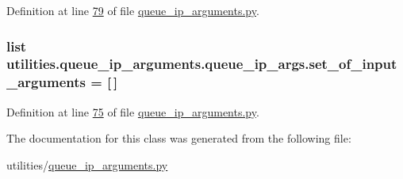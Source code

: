 Definition at line \hyperlink{queue__ip__arguments_8py_source_l00079}{79} of file \hyperlink{queue__ip__arguments_8py_source}{queue\+\_\+ip\+\_\+arguments.\+py}.

\hypertarget{classutilities_1_1queue__ip__arguments_1_1queue__ip__args_acc8e7685be71a7f95ede7c980355c9f3}{}
\subsubsection[{set\+\_\+of\+\_\+input\+\_\+arguments}]{\setlength{\rightskip}{0pt plus 5cm}list utilities.\+queue\+\_\+ip\+\_\+arguments.\+queue\+\_\+ip\+\_\+args.\+set\+\_\+of\+\_\+input\+\_\+arguments = \mbox{[}$\,$\mbox{]}\hspace{0.3cm}{\ttfamily [static]}}\label{classutilities_1_1queue__ip__arguments_1_1queue__ip__args_acc8e7685be71a7f95ede7c980355c9f3}


Definition at line \hyperlink{queue__ip__arguments_8py_source_l00075}{75} of file \hyperlink{queue__ip__arguments_8py_source}{queue\+\_\+ip\+\_\+arguments.\+py}.



The documentation for this class was generated from the following file\+:\begin{DoxyCompactItemize}
\item 
utilities/\hyperlink{queue__ip__arguments_8py}{queue\+\_\+ip\+\_\+arguments.\+py}\end{DoxyCompactItemize}
